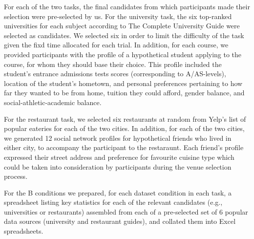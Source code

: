 \documentclass{sigchi}
\begin{document}
For each of the two tasks, the final candidates from which participants made their selection were pre-selected by us.  For the university task, the six top-ranked universities for each subject according to The Complete University Guide were selected as candidates.  We selected six in order to limit the difficulty of the task given the fixd time allocated for each trial.  In addition, for each course, we provided participants with the profile of a hypothetical student applying to the course, for whom they should base their choice.  This profile included the student's entrance admissions tests scores (corresponding to A/AS-levels), location of the student's hometown, and personal preferences pertaining to how far they wanted to be from home, tuition they could afford, gender balance, and social-athletic-academic balance.

For the restaurant task, we selected six restaurants at random from Yelp's list of popular eateries for each of the two cities.  In addition, for each of the two cities, we generated 12 social network profiles for hypothetical friends who lived in either city, to accompany the participant to the restaraunt.  Each friend's profile expressed their street address and preference for favourite cuisine type which could be taken into consideration by participants during the venue selection process. 

For the B conditions we prepared, for each dataset condition in each task, a spreadsheet listing key statistics for each of the relevant candidates (e.g., universities or restaurants) assembled from each of a pre-selected set of 6 popular data sources (university and restaurant guides), and collated them into Excel spreadsheets.  

\end{document}
